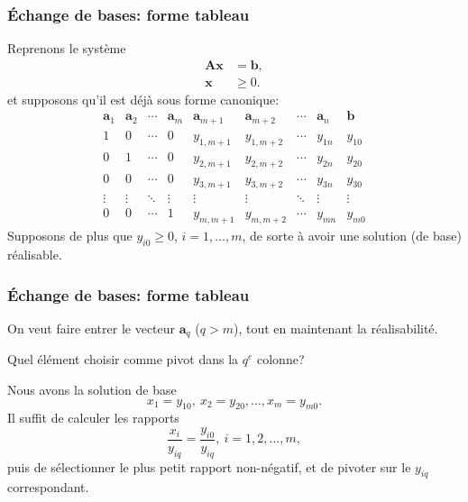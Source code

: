 \documentclass[t,usepdftitle=false]{beamer}
\def\ba{\boldsymbol{a}}
\def\bb{\boldsymbol{b}}
\def\bx{\boldsymbol{x}}
\def\bA{\boldsymbol{A}}
\begin{document}
\begin{frame}
\frametitle{Échange de bases: forme tableau}

Reprenons le système
\begin{align*}
\bA \bx &= \bb, \\
\bx &\geq 0.
\end{align*}
et supposons qu'il est déjà sous forme canonique:
\[
\begin{matrix}
\ba_1 & \ba_2 & \cdots & \ba_m & \ba_{m+1} &
\ba_{m+2} & \cdots & \ba_n & \bb \\
1 & 0 & \cdots & 0 & y_{1,m+1} & y_{1,m+2} & \cdots & y_{1n} & y_{10} \\
0 & 1 & \cdots & 0 & y_{2,m+1} & y_{2,m+2} & \cdots & y_{2n} & y_{20} \\
0 & 0 & \cdots & 0 & y_{3,m+1} & y_{3,m+2} & \cdots & y_{3n} & y_{30} \\
\vdots & \vdots & \ddots & \vdots & \vdots & \vdots & \ddots & \vdots & \vdots \\
0 & 0 & \cdots & 1 & y_{m,m+1} & y_{m,m+2} & \cdots & y_{mn} & y_{m0}
\end{matrix}
\]
Supposons de plus que $y_{i0} \geq 0$, $i = 1,\ldots, m$, de sorte à avoir une solution (de base) réalisable.

\end{frame}

\begin{frame}
\frametitle{Échange de bases: forme tableau}

On veut faire entrer le vecteur $\ba_q$ ($q > m$), tout en maintenant la réalisabilité.

\mbox{}

Quel élément choisir comme pivot dans la $q^e$ colonne?

\mbox{}

Nous avons la solution de base
\[
x_1 = y_{10},\ x_2 = y_{20},\ldots, x_m = y_{m0}. 
\]
Il suffit de calculer les rapports
\[
\frac{x_i}{y_{iq}} = \frac{y_{i0}}{y_{iq}},\ i = 1,2,\ldots,m,
\]
puis de sélectionner le plus petit rapport non-négatif, et de pivoter sur le $y_{iq}$ correspondant.

\end{frame}
\end{document}
